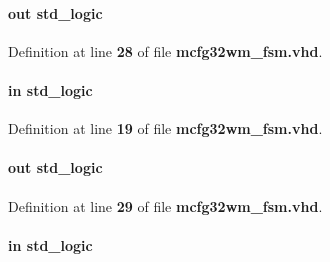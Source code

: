 \paragraph[{mem\+\_\+we}]{ {\bfseries \textcolor{keywordflow}{out}\textcolor{vhdlchar}{ }} {\bfseries \textcolor{comment}{std\+\_\+logic}\textcolor{vhdlchar}{ }} \hspace{0.3cm}{\ttfamily [Port]}}\label{classmcfg32wm__fsm_a003f0ecabf69688be558f9dbcceabc4c}


Definition at line {\bf 28} of file {\bf mcfg32wm\+\_\+fsm.\+vhd}.

\paragraph[{mimo\+\_\+en}]{ {\bfseries \textcolor{keywordflow}{in}\textcolor{vhdlchar}{ }} {\bfseries \textcolor{comment}{std\+\_\+logic}\textcolor{vhdlchar}{ }} \hspace{0.3cm}{\ttfamily [Port]}}\label{classmcfg32wm__fsm_a0c57670aee4f9fbfa3c286573012965a}


Definition at line {\bf 19} of file {\bf mcfg32wm\+\_\+fsm.\+vhd}.

\paragraph[{oe}]{ {\bfseries \textcolor{keywordflow}{out}\textcolor{vhdlchar}{ }} {\bfseries \textcolor{comment}{std\+\_\+logic}\textcolor{vhdlchar}{ }} \hspace{0.3cm}{\ttfamily [Port]}}\label{classmcfg32wm__fsm_a58ed8615dad8a24c914b5be9f221eef8}


Definition at line {\bf 29} of file {\bf mcfg32wm\+\_\+fsm.\+vhd}.

\paragraph[{reset}]{ {\bfseries \textcolor{keywordflow}{in}\textcolor{vhdlchar}{ }} {\bfseries \textcolor{comment}{std\+\_\+logic}\textcolor{vhdlchar}{ }} \hspace{0.3cm}{\ttfamily [Port]}}\label{classmcfg32wm__fsm_aad8dc6359d9e23dabcbf342fadf2fa06}



